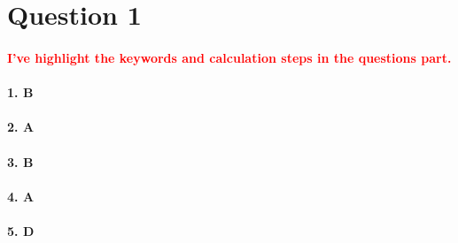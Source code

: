 \section{Question 1}
\paragraph{\textcolor{red}{I've highlight the keywords and calculation steps in the questions part.}}
\paragraph{1. B}
\paragraph{2. A}
\paragraph{3. B}
\paragraph{4. A}
\paragraph{5. D}
